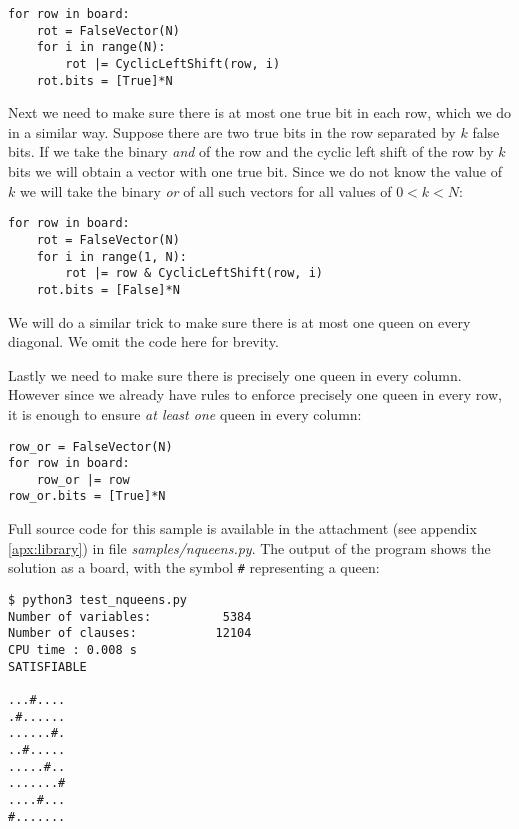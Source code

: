 \begin{verbatim}
for row in board:
    rot = FalseVector(N)
    for i in range(N):
        rot |= CyclicLeftShift(row, i)
    rot.bits = [True]*N
\end{verbatim}

Next we need to make sure there is at most one true bit in each row, which we do in a similar way.
Suppose there are two true bits in the row separated by $k$ false bits.
If we take the binary \emph{and} of the row and the cyclic left shift of the row by $k$ bits we will obtain a vector with one true bit.
Since we do not know the value of $k$ we will take the binary \emph{or} of all such vectors for all values of $0 < k < N$:

\begin{verbatim}
for row in board:
    rot = FalseVector(N)
    for i in range(1, N):
        rot |= row & CyclicLeftShift(row, i)
    rot.bits = [False]*N
\end{verbatim}

We will do a similar trick to make sure there is at most one queen on every diagonal.
We omit the code here for brevity.

Lastly we need to make sure there is precisely one queen in every column.
However since we already have rules to enforce precisely one queen in every row, it is enough to ensure \emph{at least one} queen in every column:

\begin{verbatim}
row_or = FalseVector(N)
for row in board:
    row_or |= row
row_or.bits = [True]*N
\end{verbatim}

Full source code for this sample is available in the attachment (see appendix \ref{apx:library}) in file \emph{samples/nqueens.py}.
The output of the program shows the solution as a board, with the symbol \texttt{\#} representing a queen:

\begin{Verbatim}
$ python3 test_nqueens.py
Number of variables:          5384    
Number of clauses:           12104     
CPU time : 0.008 s
SATISFIABLE

...#....
.#......
......#.
..#.....
.....#..
.......#
....#...
#.......
\end{Verbatim}

